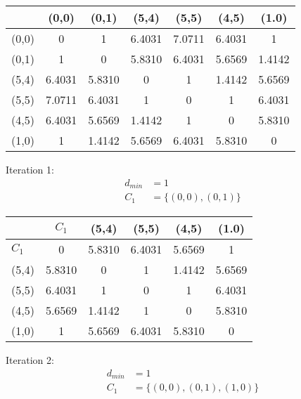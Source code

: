 \documentclass[fleqn]{article}
\begin{document}
\begin{description}
    \begin{tabular}{ l c c c c c c }
        & (0,0) & (0,1) & (5,4) & (5,5) & (4,5) & (1.0) \\       
        \hline
        (0,0) & 0 & 1 & 6.4031 & 7.0711 & 6.4031 & 1 \\
        (0,1) & 1 & 0 & 5.8310 & 6.4031 & 5.6569 & 1.4142 \\
        (5,4) & 6.4031 & 5.8310 & 0 & 1 & 1.4142 & 5.6569 \\
        (5,5) & 7.0711 & 6.4031 & 1 & 0 & 1 & 6.4031 \\
        (4,5) & 6.4031 & 5.6569 & 1.4142 & 1 & 0 & 5.8310 \\
        (1,0) & 1 & 1.4142 & 5.6569 & 6.4031 & 5.8310 & 0
    \end{tabular}
    \newline

    Iteration 1:
    \begin{align*}
        d_{min} &= 1 \\
        C_1 &= \{ (0,0), (0,1) \}
    \end{align*}

    \begin{tabular}{ l c c c c c }
        & \begin{math}C_1\end{math}        & (5,4)  & (5,5)  & (4,5)  & (1.0) \\       
        \hline
        \begin{math}C_1\end{math} & 0      & 5.8310 & 6.4031 & 5.6569 & 1 \\
        (5,4)                     & 5.8310 & 0      & 1      & 1.4142 & 5.6569 \\
        (5,5)                     & 6.4031 & 1      & 0      & 1      & 6.4031 \\
        (4,5)                     & 5.6569 & 1.4142 & 1      & 0      & 5.8310 \\
        (1,0)                     & 1      & 5.6569 & 6.4031 & 5.8310 & 0
    \end{tabular}
    \newline

    Iteration 2:
    \begin{align*}
        d_{min} &= 1 \\
        C_1 &= \{ (0,0), (0,1), (1,0) \}
    \end{align*}


\end{description}
\end{document}
